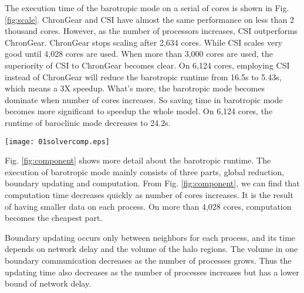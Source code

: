 \documentclass{sig-alternate}
\begin{document}


The execution time of the barotropic mode on a serial of cores is shown in Fig. \ref{fig:scale}. 
ChronGear and CSI have almost the same performance on less than 2 thousand cores.
However, as the number of processors increases, CSI outperforms ChronGear. 
ChronGear stops scaling after 2,634 cores. While CSI scales very good until 4,028 cores are used. 
When more than 3,000 cores are used, the superiority of CSI to ChronGear becomes clear. On 6,124 cores, employing CSI instead of ChronGear will reduce the barotropic runtime from 16.5s to 5.43s, which means a 3X speedup. What's more, the barotropic mode becomes dominate when number of cores increases. So saving time in barotropic mode becomes more significant to speedup the whole model. On 6,124 cores, the runtime of baroclinic mode decreases to 24.2s.  

\begin{figure*}
\begin{center}
	\texttt{[image: 01solvercomp.eps]}
\end{center}
\caption[] {Time components of one CSI step in 1 degree POP}
\label{fig:component}
\end{figure*}

Fig. \ref{fig:component} shows more detail about the barotropic runtime. The execution of barotropic mode mainly consists of three parts, global reduction, boundary updating and computation. From Fig. \ref{fig:component}, we can find that computation time decreases quickly  as number of cores increases. It is the result of having smaller data on each process. On more than 4,028 cores, computation becomes the cheapest part. 

Boundary updating occurs only between neighbors for each process, and its time depends on network delay and the volume of the halo regions. The volume in one boundary communication decreases as the number of processes grows. Thus the updating time also decreases as the number of processes increases but has a lower bound of network delay.
\end{document}
